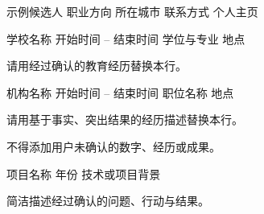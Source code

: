 \documentclass[chinese]{cv}
\begin{document}
\cvheader
  {示例候选人}
  {职业方向}
  {所在城市 \cvsep 联系方式 \cvsep 个人主页}


\cventry
  {学校名称}
  {开始时间 -- 结束时间}
  {学位与专业}
  {地点}

\begin{cvitems}
  \item 请用经过确认的教育经历替换本行。
\end{cvitems}


\cventry
  {机构名称}
  {开始时间 -- 结束时间}
  {职位名称}
  {地点}

\begin{cvitems}
  \item 请用基于事实、突出结果的经历描述替换本行。
  \item 不得添加用户未确认的数字、经历或成果。
\end{cvitems}


\cventry
  {项目名称}
  {年份}
  {技术或项目背景}
  {}

\begin{cvitems}
  \item 简洁描述经过确认的问题、行动与结果。
\end{cvitems}


\end{document}
